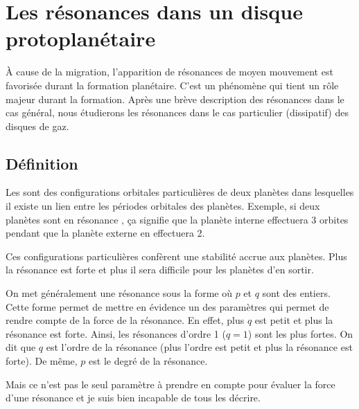 
\section{Les résonances dans un disque protoplanétaire}
À cause de la migration, l'apparition de résonances de moyen mouvement est favorisée durant la formation planétaire. C'est un phénomène qui tient un rôle majeur durant la formation. Après une brève description des résonances dans le cas général, nous étudierons les résonances dans le cas particulier (dissipatif) des disques de gaz. 

\subsection{Définition}
Les  sont des configurations orbitales particulières de deux planètes
dans lesquelles il existe un lien entre les périodes orbitales des planètes. Exemple, si deux planètes sont en résonance
, ça signifie que la planète interne effectuera 3 orbites pendant que la planète externe en effectuera 2.

Ces configurations particulières confèrent une stabilité accrue aux planètes. Plus la résonance est forte et plus il sera
difficile pour les planètes d'en sortir.

\bigskip

On met généralement une résonance sous la forme  où $p$ et $q$ sont des entiers. Cette forme permet de mettre en
évidence un des paramètres qui permet de rendre compte de la force de la résonance. En effet, plus $q$ est petit et plus la
résonance est forte. Ainsi, les résonances d'ordre 1 ($q=1$) sont les plus fortes. On dit que $q$ est l'ordre de la résonance
(plus l'ordre est petit et plus la résonance est forte). De même, $p$ est le degré de la résonance.

\begin{attention}
Mais ce n'est pas le seul paramètre à prendre en compte pour évaluer la force d'une résonance et je suis bien incapable de tous
les décrire.
\end{attention}


